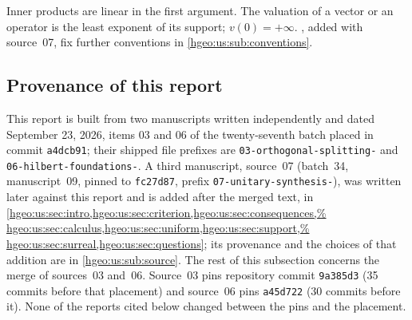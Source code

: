 \documentclass[11pt,letterpaper]{article}
\numberwithin{equation}{section}
\theoremstyle{definition}
\theoremstyle{remark}
\newcommand{\fn}[1]{\nolinkurl{#1}}
\begin{document}
Inner products are linear in the first argument. The valuation of a vector
or an operator is the least exponent of its support; $v(0)=+\infty$.
, added with source~07, fix further
conventions in \cref{hgeo:us:sub:conventions}.

\subsection{Provenance of this report}\label{hgeo:sub:provenance}
This report is built from two manuscripts written independently and dated
September 23, 2026, items 03 and 06 of the twenty-seventh batch placed in
commit \texttt{a4dcb91}; their shipped file prefixes are
\fn{03-orthogonal-splitting-} and \fn{06-hilbert-foundations-}.
A third manuscript, source~07 (batch~34, manuscript~09, pinned to
\texttt{fc27d87}, prefix \fn{07-unitary-synthesis-}), was written later
against this report and is added after the merged text, in
\cref{hgeo:us:sec:intro,hgeo:us:sec:criterion,hgeo:us:sec:consequences,%
hgeo:us:sec:calculus,hgeo:us:sec:uniform,hgeo:us:sec:support,%
hgeo:us:sec:surreal,hgeo:us:sec:questions}; its provenance and the choices
of that addition are in \cref{hgeo:us:sub:source}. The rest of this subsection
concerns the merge of sources~03 and~06.
Source~03 pins repository commit \texttt{9a385d3} (35 commits before that
placement) and source~06 pins \texttt{a45d722} (30 commits before it). None
of the reports cited below changed between the pins and the placement.
\end{document}
